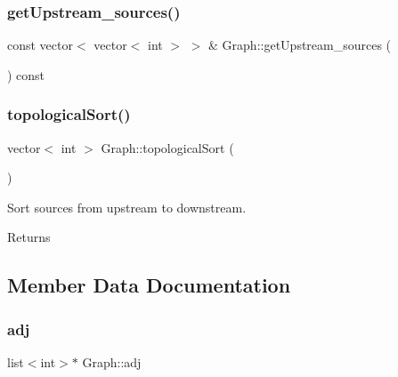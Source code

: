 \subsubsection{\texorpdfstring{get\+Upstream\+\_\+sources()}{getUpstream\_sources()}}
{\footnotesize\ttfamily const vector$<$ vector$<$ int $>$ $>$ \& Graph\+::get\+Upstream\+\_\+sources (\begin{DoxyParamCaption}{ }\end{DoxyParamCaption}) const}

\mbox{\label{classGraph_a8f154c485f989828d6fb515a28190ac2}} 
\subsubsection{\texorpdfstring{topological\+Sort()}{topologicalSort()}}
{\footnotesize\ttfamily vector$<$ int $>$ Graph\+::topological\+Sort (\begin{DoxyParamCaption}{ }\end{DoxyParamCaption})\hspace{0.3cm}{\ttfamily [protected]}}

Sort sources from upstream to downstream. \begin{DoxyReturn}{Returns}

\end{DoxyReturn}


\subsection{Member Data Documentation}
\mbox{\label{classGraph_a04ab9c17ad31aa036def8db0f88b035b}} 
\subsubsection{\texorpdfstring{adj}{adj}}
{\footnotesize\ttfamily list$<$int$>$$\ast$ Graph\+::adj\hspace{0.3cm}{\ttfamily [protected]}}

\mbox{\label{classGraph_af903899bcb412f62ec4aa295eef9f45c}} 
